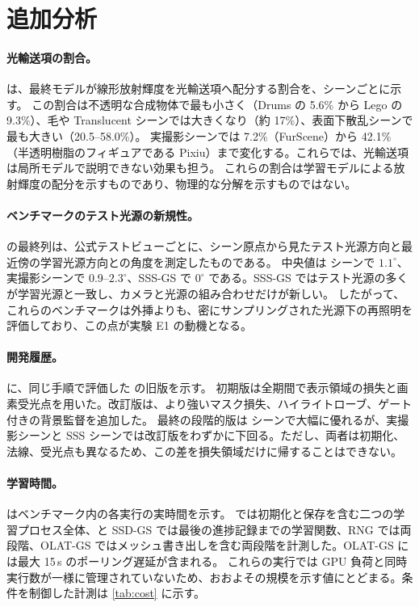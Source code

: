 \documentclass[10pt,twocolumn,letterpaper]{article}
\begin{document}


\section{追加分析}
\label{sec:s_analysis}

\paragraph{光輸送項の割合。}
 は、最終モデルが線形放射輝度を光輸送項へ配分する割合を、シーンごとに示す。
この割合は不透明な合成物体で最も小さく（Drums の 5.6\% から Lego の 9.3\%）、毛や Translucent シーンでは大きくなり（約 17\%）、表面下散乱シーンで最も大きい（20.5--58.0\%）。
実撮影シーンでは 7.2\%（FurScene）から 42.1\%（半透明樹脂のフィギュアである Pixiu）まで変化する。これらでは、光輸送項は局所モデルで説明できない効果も担う。
これらの割合は学習モデルによる放射輝度の配分を示すものであり、物理的な分解を示すものではない。



\paragraph{ベンチマークのテスト光源の新規性。}
 の最終列は、公式テストビューごとに、シーン原点から見たテスト光源方向と最近傍の学習光源方向との角度を測定したものである。
中央値は \gsthree シーンで $1.1^\circ$、実撮影シーンで 0.9--$2.3^\circ$、SSS-GS で $0^\circ$ である。SSS-GS ではテスト光源の多くが学習光源と一致し、カメラと光源の組み合わせだけが新しい。
したがって、これらのベンチマークは外挿よりも、密にサンプリングされた光源下の再照明を評価しており、この点が実験 E1 の動機となる。

\paragraph{開発履歴。}
 に、同じ手順で評価した \ours の旧版を示す。
初期版は全期間で表示領域の損失と画素受光点を用いた。改訂版は、より強いマスク損失、ハイライトローブ、ゲート付きの背景監督を追加した。
最終の段階的版は \gsthree シーンで大幅に優れるが、実撮影シーンと SSS シーンでは改訂版をわずかに下回る。ただし、両者は初期化、法線、受光点も異なるため、この差を損失領域だけに帰することはできない。



\paragraph{学習時間。}
 はベンチマーク内の各実行の実時間を示す。
\ours では初期化と保存を含む二つの学習プロセス全体、\gsthree と SSD-GS では最後の進捗記録までの学習関数、RNG では両段階、OLAT-GS ではメッシュ書き出しを含む両段階を計測した。OLAT-GS には最大 15\,s のポーリング遅延が含まれる。
これらの実行では GPU 負荷と同時実行数が一様に管理されていないため、おおよその規模を示す値にとどまる。条件を制御した計測は \cref{tab:cost} に示す。
\end{document}
